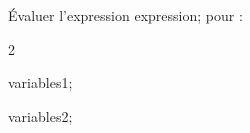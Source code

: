 \documentclass[exercice]{thedocument}%
\begin{document}
%
\smallskip\par\noindent Évaluer l'expression \<expression; pour :
\begin{enumerate}
    \begin{multicols}{2}
        \item \<variables1;
        \columnbreak
        \item \<variables2;
    \end{multicols}
\end{enumerate}
\end{document}
